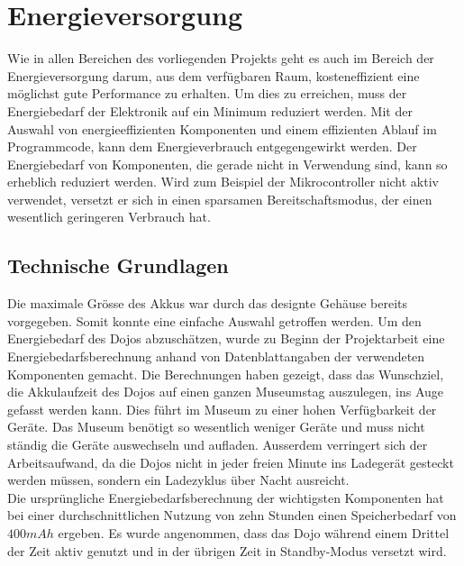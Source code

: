 \chapter{Energieversorgung}
\label{Energieversorgung}
\thispagestyle{fancy} 

Wie in allen Bereichen des vorliegenden Projekts geht es auch im Bereich der Energieversorgung darum, aus dem verfügbaren Raum, kosteneffizient eine möglichst gute Performance zu erhalten. Um dies zu erreichen, muss der Energiebedarf der Elektronik auf ein Minimum reduziert werden. Mit der Auswahl von energieeffizienten Komponenten und einem effizienten Ablauf im Programmcode, kann dem Energieverbrauch entgegengewirkt werden. Der Energiebedarf von Komponenten, die gerade nicht in Verwendung sind, kann so erheblich reduziert werden. Wird zum Beispiel der Mikrocontroller nicht aktiv verwendet, versetzt er sich in einen sparsamen Bereitschaftsmodus, der einen wesentlich geringeren Verbrauch hat.

\section{Technische Grundlagen}
 
Die maximale Grösse des Akkus war durch das designte Gehäuse bereits vorgegeben. Somit konnte eine einfache Auswahl getroffen werden. Um den Energiebedarf des Dojos abzuschätzen, wurde zu Beginn der Projektarbeit eine Energiebedarfsberechnung anhand von Datenblattangaben der verwendeten Komponenten gemacht. Die Berechnungen haben gezeigt, dass das Wunschziel, die Akkulaufzeit des Dojos auf einen ganzen Museumstag auszulegen, ins Auge gefasst werden kann. Dies führt im Museum zu einer hohen Verfügbarkeit der Geräte.  Das Museum benötigt so wesentlich weniger Geräte und muss nicht ständig die Geräte auswechseln und aufladen. Ausserdem verringert sich der Arbeitsaufwand, da die Dojos nicht in jeder freien Minute ins Ladegerät gesteckt werden müssen, sondern ein Ladezyklus über Nacht ausreicht.\\

Die ursprüngliche Energiebedarfsberechnung der wichtigsten Komponenten hat bei einer durchschnittlichen Nutzung von zehn Stunden einen Speicherbedarf von $400mAh$ ergeben. Es wurde angenommen, dass das Dojo während einem Drittel der Zeit aktiv genutzt und in der übrigen Zeit in Standby-Modus versetzt wird.\\ 


